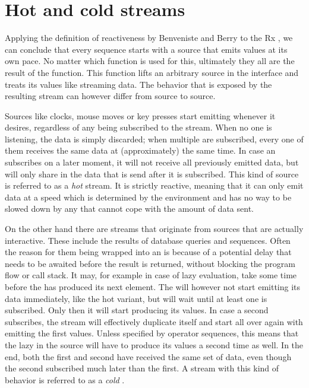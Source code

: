 \section{Hot and cold streams}
Applying the definition of reactiveness by Benveniste and Berry\cite{berry1991-Reactive} to the Rx \obs, we can conclude that every \obs sequence starts with a source that emits values at its own pace. No matter which function is used for this, ultimately they all are the result of the  function. This function lifts an arbitrary source in the \obs interface and treats its values like streaming data. The behavior that is exposed by the resulting stream can however differ from source to source.

Sources like clocks, mouse moves or key presses start emitting whenever it desires, regardless of any \obv being subscribed to the stream. When no one is listening, the data is simply discarded; when multiple \obv are subscribed, every one of them receives the same data at (approximately) the same time. In case an \obv subscribes on a later moment, it will not receive all previously emitted data, but will only share in the data that is send after it is subscribed. This kind of source is referred to as a \textit{hot} stream. It is strictly reactive, meaning that it can only emit data at a speed which is determined by the environment and has no way to be slowed down by any \obv that cannot cope with the amount of data sent.

On the other hand there are streams that originate from sources that are actually interactive. These include the results of database queries and \itb sequences. Often the reason for them being wrapped into an \obs is because of a potential delay that needs to be awaited before the result is returned, without blocking the program flow or call stack. It may, for example in case of lazy evaluation, take some time before the \itr has produced its next element. The \obs will however not start emitting its data immediately, like the hot variant, but will wait until at least one \obv is subscribed. Only then it will start producing its values. In case a second \obv subscribes, the stream will effectively duplicate itself and start all over again with emitting the first values. Unless specified by operator sequences, this means that the lazy \itr in the source will have to produce its values a second time as well. In the end, both the first and second \obv have received the same set of data, even though the second subscribed much later than the first. A stream with this kind of behavior is referred to as a \textit{cold} \obs.


